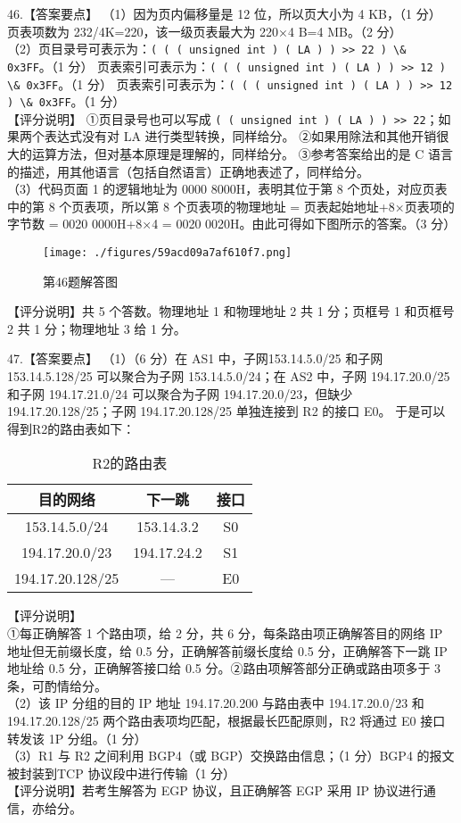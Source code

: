 46.【答案要点】
（1）因为页内偏移量是 12 位，所以页大小为 4 KB，（1 分） 页表项数为 232/4K=220，该一级页表最大为 220×4 B=4 MB。（2 分）  \\
（2）页目录号可表示为：\verb|( ( ( unsigned int ) ( LA ) ) >> 22 ) \& 0x3FF|。（1 分）        页表索引可表示为：\verb|( ( ( unsigned int ) ( LA ) ) >> 12 ) \& 0x3FF|。（1 分）        页表索引可表示为：\verb|( ( ( unsigned int ) ( LA ) ) >> 12 ) \& 0x3FF|。（1 分） \\
【评分说明】 
①页目录号也可以写成 \verb|( ( unsigned int ) ( LA ) ) >> 22|；如果两个表达式没有对 LA 进行类型转换，同样给分。 
②如果用除法和其他开销很大的运算方法，但对基本原理是理解的，同样给分。 
③参考答案给出的是 C 语言的描述，用其他语言（包括自然语言）正确地表述了，同样给分。  \\
（3）代码页面 1 的逻辑地址为 0000 8000H，表明其位于第 8 个页处，对应页表中的第 8 个页表项，所以第 8 个页表项的物理地址 = 页表起始地址+8×页表项的字节数 = 0020 
0000H+8×4 = 0020 0020H。由此可得如下图所示的答案。（3 分）
\begin{figure}[ht]
\centering
\texttt{[image: ./figures/59acd09a7af610f7.png]}
\caption{第46题解答图} \label{fig_CSN13_14}
\end{figure}
【评分说明】共 5 个答数。物理地址 1 和物理地址 2 共 1 分；页框号 1 和页框号 2 共 1 分；物理地址 3 给 1 分。

47.【答案要点】 
  （1）（6 分）在 AS1 中，子网153.14.5.0/25 和子网 153.14.5.128/25 可以聚合为子网
153.14.5.0/24；在 AS2 中，子网 194.17.20.0/25 和子网 194.17.21.0/24 可以聚合为子网 194.17.20.0/23，但缺少 194.17.20.128/25；子网 194.17.20.128/25 单独连接到 R2 的接口 E0。 
于是可以得到R2的路由表如下：
\begin{table}[ht]
\centering
\caption{R2的路由表}\label{tab_CSN13_9}
\begin{tabular}{|c|c|c|}
\hline
目的网络 & 下一跳 & 接口  \\
\hline
153.14.5.0/24 & 153.14.3.2 & S0  \\
\hline
194.17.20.0/23 & 194.17.24.2 & S1  \\
\hline
194.17.20.128/25 & — & E0  \\
\hline
\end{tabular}
\end{table}
【评分说明】 \\
①每正确解答 1 个路由项，给 2 分，共 6 分，每条路由项正确解答目的网络 IP 地址但无前缀长度，给 0.5 分，正确解答前缀长度给 0.5 分，正确解答下一跳 IP 地址给 0.5 分，正确解答接口给 0.5 分。②路由项解答部分正确或路由项多于 3 条，可酌情给分。 \\
（2）该 IP 分组的目的 IP 地址 194.17.20.200 与路由表中 194.17.20.0/23 和 194.17.20.128/25 两个路由表项均匹配，根据最长匹配原则，R2 将通过 E0 接口转发该 1P 分组。（1 分） \\
（3）R1 与 R2 之间利用 BGP4（或 BGP）交换路由信息；（1 分）BGP4 的报文被封装到TCP 协议段中进行传输（1 分） \\
【评分说明】若考生解答为 EGP 协议，且正确解答 EGP 采用 IP 协议进行通信，亦给分。 